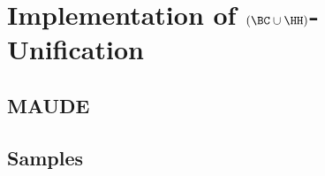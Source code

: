 \chapter{Implementation of \texorpdfstring{$(\BC \cup \HH)$}{(BC U H)}-Unification}\label{chap:implementation}

\section{MAUDE}\label{sec:maude}

\section{Samples}\label{sec:samples}

